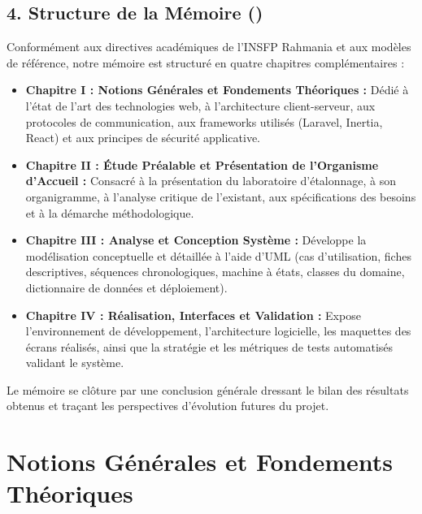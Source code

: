 \documentclass{bts-report}
\begin{document}
\section*{4. Structure de la M\'emoire ()}
Conform\'ement aux directives acad\'emiques de l'INSFP Rahmania et aux mod\`eles de r\'ef\'erence, notre m\'emoire est structur\'e en quatre chapitres compl\'ementaires :
\begin{itemize}
  \item \textbf{Chapitre I : Notions G\'en\'erales et Fondements Th\'eoriques :} D\'edi\'e \`a l'\'etat de l'art des technologies web, \`a l'architecture client-serveur, aux protocoles de communication, aux frameworks utilis\'es (Laravel, Inertia, React) et aux principes de s\'ecurit\'e applicative.
  \item \textbf{Chapitre II : \'Etude Pr\'ealable et Pr\'esentation de l'Organisme d'Accueil :} Consacr\'e \`a la pr\'esentation du laboratoire d'\'etalonnage, \`a son organigramme, \`a l'analyse critique de l'existant, aux sp\'ecifications des besoins et \`a la d\'emarche m\'ethodologique.
  \item \textbf{Chapitre III : Analyse et Conception Syst\`eme :} D\'eveloppe la mod\'elisation conceptuelle et d\'etaill\'ee \`a l'aide d'UML (cas d'utilisation, fiches descriptives, s\'equences chronologiques, machine \`a \'etats, classes du domaine, dictionnaire de donn\'ees et d\'eploiement).
  \item \textbf{Chapitre IV : R\'ealisation, Interfaces et Validation :} Expose l'environnement de d\'eveloppement, l'architecture logicielle, les maquettes des \'ecrans r\'ealis\'es, ainsi que la strat\'egie et les m\'etriques de tests automatis\'es validant le syst\`eme.
\end{itemize}

Le m\'emoire se cl\^oture par une conclusion g\'en\'erale dressant le bilan des r\'esultats obtenus et tra\c{c}ant les perspectives d'\'evolution futures du projet.


\chapter{Notions G\'en\'erales et Fondements Th\'eoriques}
\end{document}
